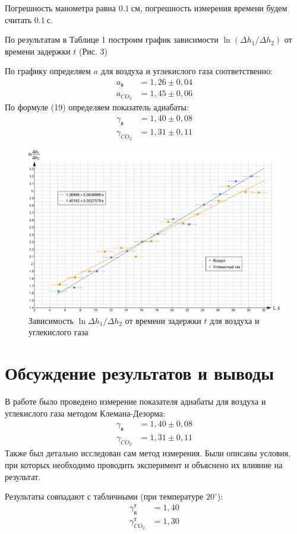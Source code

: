 \documentclass[a4paper,12pt]{article}
\theoremstyle{plain} %
\theoremstyle{definition} %
\theoremstyle{remark} %
\begin{document}
Погрешность манометра равна $0.1\ \text{см}$, погрешность измерения времени будем считать $0.1\ \text{с}$.

По результатам в Таблице 1 построим график зависимости $\ln(\Delta h_1/\Delta h_2)$ от времени задержки $t$ (Рис. 3)

\noindent По графику определяем $a$ для воздуха и углекислого газа соответственно:
\begin{align*}
a_\text{в}& = 1,26\pm0,04\\
a_{CO_2}& = 1,45\pm0,06
\end{align*}
По формуле (19) определяем показатель адиабаты:
\begin{align*}
\gamma_\text{в}& = 1,40\pm0,08\\
\gamma_{CO_2}& = 1,31\pm0,11
\end{align*}
\begin{figure}[H]
	\begin{center}
		\includegraphics[width=\linewidth]{Image}
		\captionsetup{justification=centering}
		\caption{Зависимость $\ln \Delta h_1/\Delta h_2$ от времени задержки $t$ для воздуха и углекислого газа}
	\end{center}
\end{figure}
\section{Обсуждение результатов и выводы}
В работе было проведено измерение показателя адиабаты для воздуха и углекислого газа методом Клемана-Дезорма:
\begin{align*}
\gamma_\text{в}& = 1,40\pm0,08\\
\gamma_{CO_2}& = 1,31\pm0,11
\end{align*}
Также был детально исследован сам метод измерения. Были описаны условия, при которых необходимо проводить эксперимент и объяснено их влияние на результат.

Результаты совпадают с табличными (при температуре $20^\circ$):
\begin{align*}
\gamma_\text{в}^\text{т}& = 1,40\\
\gamma_{CO_2}^\text{т}& = 1,30
\end{align*}
\end{document}
